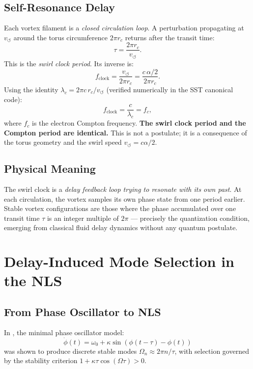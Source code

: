 \documentclass[11pt,a4paper]{article}
\begin{document}
\subsection{Self-Resonance Delay}

Each vortex filament is a \emph{closed circulation loop}. A perturbation propagating
at $v_{\circlearrowleft}$ around the torus circumference $2\pi r_c$ returns after the
transit time:
\[
  \tau = \frac{2\pi r_c}{v_{\circlearrowleft}}.
\]
This is the \emph{swirl clock period}. Its inverse is:
\[
  f_\text{clock} = \frac{v_{\circlearrowleft}}{2\pi r_c}
  = \frac{c\,\alpha/2}{2\pi r_c}.
\]
Using the identity $\lambda_c = 2\pi c\, r_c / v_{\circlearrowleft}$ (verified
numerically in the SST canonical code):
\begin{equation}\label{eq:clock}
  \boxed{f_\text{clock} = \frac{c}{\lambda_c} = f_c,}
\end{equation}
where $f_c$ is the electron Compton frequency. \textbf{The swirl clock period and the
Compton period are identical.} This is not a postulate; it is a consequence of the
torus geometry and the swirl speed $v_{\circlearrowleft} = c\alpha/2$.

\subsection{Physical Meaning}

The swirl clock is a \emph{delay feedback loop trying to resonate with its own past}.
At each circulation, the vortex samples its own phase state from one period earlier.
Stable vortex configurations are those where the phase accumulated over one transit
time $\tau$ is an integer multiple of $2\pi$ --- precisely the quantization condition,
emerging from classical fluid delay dynamics without any quantum postulate.

\section{Delay-Induced Mode Selection in the NLS}\label{sec:modes}

\subsection{From Phase Oscillator to NLS}

In \cite{Iskandarani2026AIP}, the minimal phase oscillator model:
\[
  \dot{\phi}(t) = \omega_0 + \kappa\sin\!\left(\phi(t-\tau) - \phi(t)\right)
\]
was shown to produce discrete stable modes $\Omega_n \approx 2\pi n/\tau$, with
selection governed by the stability criterion $1 + \kappa\tau\cos(\Omega\tau) > 0$.
\end{document}
